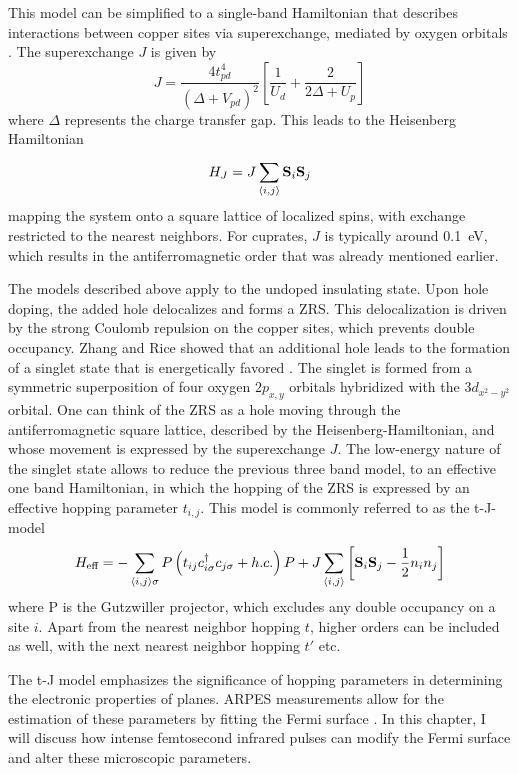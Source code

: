 This model can be simplified to a single-band Hamiltonian that describes interactions between copper sites via superexchange, mediated by oxygen orbitals \cite{anderson_new_1959, zhang_effective_1988, emery_mechanism_1988}.
The superexchange $J$ is given by
\begin{equation}
	J= \frac{4t_{pd}^4}{\left(\Delta + V_{pd} \right)^2} \left[\frac{1}{U_d} + \frac{2}{2\Delta + U_p}\right]
\end{equation}
where $\Delta$ represents the charge transfer gap.
This leads to the Heisenberg Hamiltonian
\begin{equation}
	H_J = J \sum_{\braket{i,j}}^{} \mathbf{S}_i \mathbf{S}_j
\end{equation}
mapping the system onto a square lattice of localized spins, with exchange restricted to the nearest neighbors.
For cuprates, $J$ is typically around \qty{0.1}{\electronvolt}, which results in the antiferromagnetic order that was already mentioned earlier.

The models described above apply to the undoped insulating state.
Upon hole doping, the added hole delocalizes and forms a ZRS.
This delocalization is driven by the strong Coulomb repulsion on the copper sites, which prevents double occupancy.
Zhang and Rice showed that an additional hole leads to the formation of a singlet state that is energetically favored \cite{zhang_effective_1988}.
The singlet is formed from a symmetric superposition of four oxygen $2p_{x,y}$ orbitals hybridized with the  $3d_{x^2-y^2}$ orbital.
One can think of the ZRS as a hole moving through the antiferromagnetic square lattice, described by the Heisenberg-Hamiltonian, and whose movement is expressed by the superexchange $J$.
The low-energy nature of the singlet state allows to reduce the previous three band model, to an effective one band Hamiltonian, in which the hopping of the ZRS is expressed by an effective hopping parameter $t_{i,j}$.
This model is commonly referred to as the t-J-model
\begin{equation}
	H_\text{eff} = - \sum_{\braket{i,j}\sigma} P \left( t_{ij} c_{i\sigma}^\dagger c_{j\sigma} + h.c. \right) P + J \sum_{\braket{i,j}} \left[\mathbf{S}_i \mathbf{S}_j - \frac{1}{2} n_i n_j\right]
\end{equation}
where P is the Gutzwiller projector, which excludes any double occupancy on a site $i$.
Apart from the nearest neighbor hopping $t$, higher orders can be included as well, with the next nearest neighbor hopping $t'$ etc.

The t-J model emphasizes the significance of hopping parameters in determining the electronic properties of  planes.
ARPES measurements allow for the estimation of these parameters by fitting the Fermi surface \cite{norman_phenomenological_1995}.
In this chapter, I will discuss how intense femtosecond infrared pulses can modify the Fermi surface and alter these microscopic parameters.

